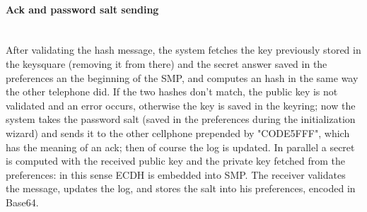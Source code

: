 \paragraph{Ack and password salt sending} \hspace{0pt} \\
After validating the hash message, the system fetches the key previously stored in the keysquare (removing it from there) and the secret answer saved in the preferences an the beginning of the SMP, and computes an hash in the same way the other telephone did. If the two hashes don't match, the public key is not validated and an error occurs, otherwise the key is saved in the keyring; now the system takes the password salt (saved in the preferences during the initialization wizard) and sends it to the other cellphone prepended by "CODE5FFF", which has the meaning of an ack; then of course the log is updated. In parallel a secret is computed with the received public key and the private key fetched from the preferences: in this sense ECDH is embedded into SMP. The receiver validates the message, updates the log, and stores the salt into his preferences, encoded in Base64.